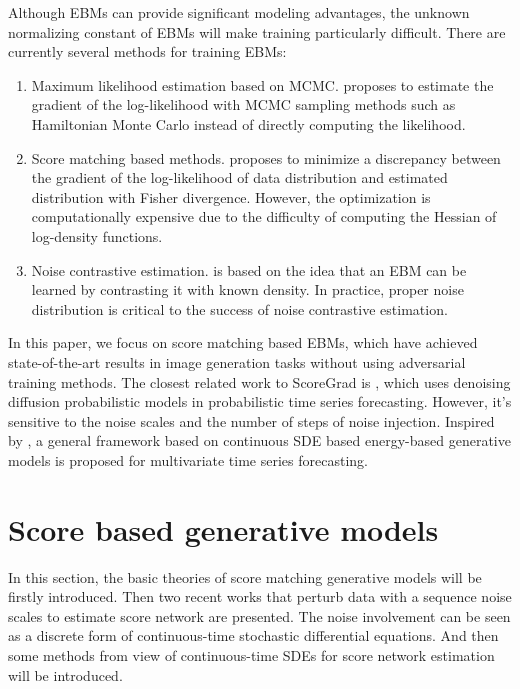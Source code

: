 Although EBMs can provide significant modeling advantages, the unknown normalizing constant of EBMs will make training particularly difficult. There are currently several methods for training EBMs: 
\begin{enumerate}
	\item Maximum likelihood estimation based on MCMC. \cite{younes1999convergence} proposes to estimate the gradient of the log-likelihood with MCMC sampling methods such as Hamiltonian Monte Carlo \cite{duane1987hybrid} instead of directly computing the likelihood.
	\item Score matching based methods.  \cite{hyvarinen2005estimation} proposes to minimize a discrepancy between the gradient of the log-likelihood of data distribution and estimated distribution with Fisher divergence. However, the optimization is computationally expensive due to the difficulty of computing the Hessian of log-density functions.
	\item Noise contrastive estimation. \cite{gutmann2010noise} is based on the idea that an EBM can be learned by contrasting it with known density. In practice, proper noise distribution is critical to the success of noise contrastive estimation.
\end{enumerate}

In this paper, we focus on score matching based EBMs, which have achieved state-of-the-art results \cite{ho2020denoising,song2020score} in image generation tasks without using adversarial training methods. The closest related work to ScoreGrad is \cite{rasul2021autoregressive}, which uses denoising diffusion probabilistic models in probabilistic time series forecasting. However, it's sensitive to the noise scales and the number of steps of noise injection. Inspired by \cite{song2020score}, a general framework based on continuous SDE based energy-based generative models is proposed for multivariate time series forecasting. %

\section{Score based generative models}
In this section, the basic theories of score matching generative models will be firstly introduced. Then two recent works that perturb data with a sequence noise scales to estimate score network are presented. The noise involvement can be seen as a discrete form of continuous-time stochastic differential equations. And then some methods from view of continuous-time SDEs for score network estimation will be introduced.
